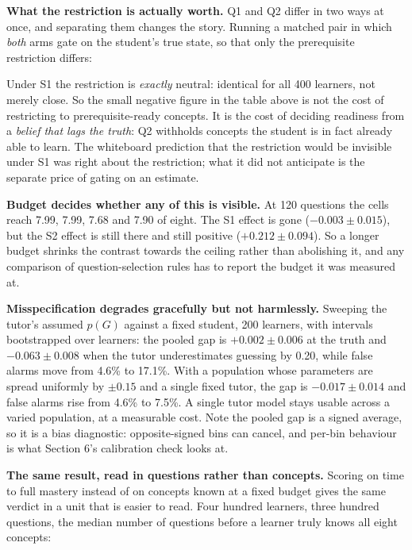 \documentclass[11pt]{article}
\begin{document}
\textbf{What the restriction is actually worth.} Q1 and Q2 differ in two ways
at once, and separating them changes the story. Running a matched pair in
which \emph{both} arms gate on the student's true state, so that only the
prerequisite restriction differs:



\noindent Under S1 the restriction is \emph{exactly} neutral: identical for
all 400 learners, not merely close. So the small negative figure in the table
above is not the cost of restricting to prerequisite-ready concepts. It is the
cost of deciding readiness from a \emph{belief that lags the truth}: Q2
withholds concepts the student is in fact already able to learn. The
whiteboard prediction that the restriction would be invisible under S1 was
right about the restriction; what it did not anticipate is the separate price
of gating on an estimate.

\textbf{Budget decides whether any of this is visible.} At 120 questions the
cells reach 7.99, 7.99, 7.68 and 7.90 of eight. The S1 effect is gone
($-0.003 \pm 0.015$), but the S2 effect is still there and still positive
($+0.212 \pm 0.094$). So a longer budget shrinks the contrast towards the
ceiling rather than abolishing it, and any comparison of question-selection
rules has to report the budget it was measured at.

\textbf{Misspecification degrades gracefully but not harmlessly.} Sweeping the
tutor's assumed $p(G)$ against a fixed student, 200 learners, with intervals
bootstrapped over learners: the pooled gap is $+0.002 \pm 0.006$ at the truth
and $-0.063 \pm 0.008$ when the tutor underestimates guessing by 0.20, while
false alarms move from 4.6\% to 17.1\%. With a population whose parameters are
spread uniformly by $\pm 0.15$ and a single fixed tutor, the gap is
$-0.017 \pm 0.014$ and false alarms rise from 4.6\% to 7.5\%. A single tutor
model stays usable across a varied population, at a measurable cost. Note the
pooled gap is a signed average, so it is a bias diagnostic: opposite-signed
bins can cancel, and per-bin behaviour is what Section 6's calibration check
looks at.

\textbf{The same result, read in questions rather than concepts.}
Scoring on time to full mastery instead of on concepts known at a fixed
budget gives the same verdict in a unit that is easier to read. Four
hundred learners, three hundred questions, the median number of questions
before a learner truly knows all eight concepts:
\end{document}
